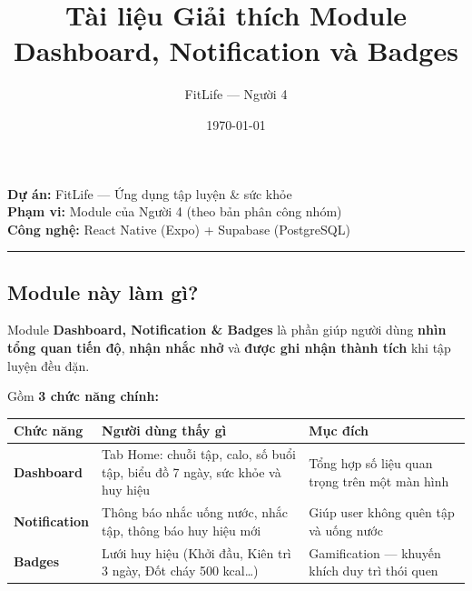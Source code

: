 \documentclass[12pt,a4paper]{article}
\title{Tài liệu Giải thích Module Dashboard, Notification và Badges}
\author{FitLife --- Người 4}
\date{\today}
\newcounter{none}
\begin{document}
\maketitle
\tableofcontents
\newpage

\textbf{Dự án:} FitLife --- Ứng dụng tập luyện \& sức khỏe\\
\textbf{Phạm vi:} Module của Người 4 (theo bản phân công nhóm)\\
\textbf{Công nghệ:} React Native (Expo) + Supabase (PostgreSQL)

\begin{center}\rule{0.5\linewidth}{0.5pt}\end{center}

\subsection{Module này làm gì?}\label{module-nuxe0y-luxe0m-guxec}

Module \textbf{Dashboard, Notification \& Badges} là phần giúp người
dùng \textbf{nhìn tổng quan tiến độ}, \textbf{nhận nhắc nhở} và
\textbf{được ghi nhận thành tích} khi tập luyện đều đặn.

Gồm \textbf{3 chức năng chính:}

{\def\LTcaptype{none} %
\begin{longtable}[]{@{}
  >{\raggedright\arraybackslash}p{}
  >{\raggedright\arraybackslash}p{}
  >{\raggedright\arraybackslash}p{}@{}}
\toprule\noalign{}
\begin{minipage}[b]{\linewidth}\raggedright
Chức năng
\end{minipage} & \begin{minipage}[b]{\linewidth}\raggedright
Người dùng thấy gì
\end{minipage} & \begin{minipage}[b]{\linewidth}\raggedright
Mục đích
\end{minipage} \\
\midrule\noalign{}
\endhead
\bottomrule\noalign{}
\endlastfoot
\textbf{Dashboard} & Tab Home: chuỗi tập, calo, số buổi tập, biểu đồ 7
ngày, sức khỏe và huy hiệu & Tổng hợp số liệu quan trọng trên một màn
hình \\
\textbf{Notification} & Thông báo nhắc uống nước, nhắc tập, thông báo
huy hiệu mới & Giúp user không quên tập và uống nước \\
\textbf{Badges} & Lưới huy hiệu (Khởi đầu, Kiên trì 3 ngày, Đốt cháy 500
kcal\ldots) & Gamification --- khuyến khích duy trì thói quen \\
\end{longtable}
}
\end{document}
